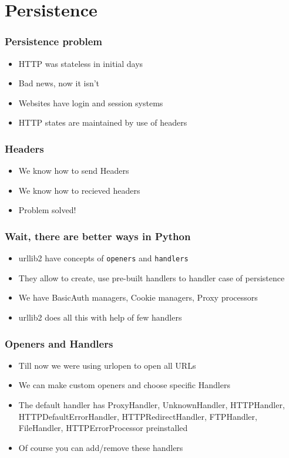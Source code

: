 \documentclass{beamer}
\begin{document}
\section{Persistence}
\label{sec-9}
\begin{frame}
\frametitle{Persistence problem}
\label{sec-9_1}


\begin{itemize}
\item HTTP was stateless in initial days
\item Bad news, now it isn't
\item Websites have login and session systems
\item HTTP states are maintained by use of headers
\end{itemize}
\end{frame}
\begin{frame}
\frametitle{Headers}
\label{sec-9_2}


\begin{itemize}
\item We know how to send Headers
\item We know how to recieved headers
\item Problem solved!
\end{itemize}
\end{frame}
\begin{frame}
\frametitle{Wait, there are better ways in Python}
\label{sec-9_3}


\begin{itemize}
\item urllib2 have concepts of \texttt{openers} and \texttt{handlers}
\item They allow to create, use pre-built handlers to handler case of persistence
\item We have BasicAuth managers, Cookie managers, Proxy processors
\item urllib2 does all this with help of few handlers
\end{itemize}
\end{frame}
\begin{frame}
\frametitle{Openers and Handlers}
\label{sec-9_4}


\begin{itemize}
\item Till now we were using urlopen to open all URLs
\item We can make custom openers and choose specific Handlers
\item The default handler has ProxyHandler, UnknownHandler, HTTPHandler, HTTPDefaultErrorHandler, HTTPRedirectHandler, FTPHandler, FileHandler, HTTPErrorProcessor preinstalled
\item Of course you can add/remove these handlers
\end{itemize}
\end{frame}
\end{document}
